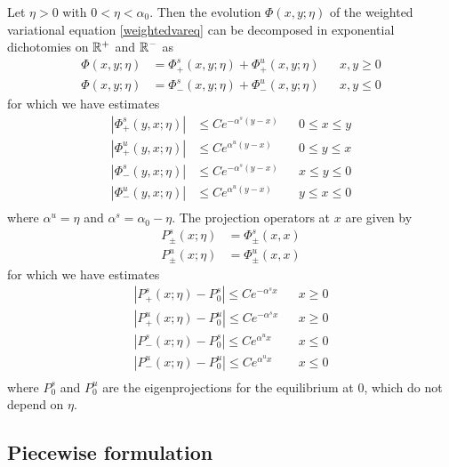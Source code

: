 \documentclass[thesis.tex]{subfiles}
\begin{document}
\begin{lemma}\label{weighteddichotomylemma}
Let $\eta > 0$ with $0 < \eta < \alpha_0$. Then the evolution $\Phi(x, y; \eta)$ of the weighted variational equation \cref{weightedvareq} can be decomposed in exponential dichotomies on $\mathbb{R}^+$ and $\mathbb{R}^-$ as
\begin{align*}
\Phi(x, y; \eta) &= \Phi^s_+(x, y; \eta) + \Phi^u_+(x, y; \eta) && x, y \geq 0 \\
\Phi(x, y; \eta) &= \Phi^s_-(x, y; \eta) + \Phi^u_-(x, y; \eta) && x, y \leq 0 
\end{align*}
for which we have estimates
\begin{align*}
|\Phi^s_+(y,x; \eta)| &\leq Ce^{-\alpha^s(y-x)} && 0 \leq x \leq y \\
|\Phi^u_+(y,x; \eta)| &\leq Ce^{\alpha^u(y-x)}  && 0 \leq y \leq x \\
|\Phi^s_-(y,x; \eta)| &\leq Ce^{-\alpha^s(y-x)} && x \leq y \leq 0 \\
|\Phi^u_-(y,x; \eta)| &\leq Ce^{\alpha^u(y-x)}  && y \leq x \leq 0 \\
\end{align*}
where $\alpha^u = \eta$ and $\alpha^s = \alpha_0 - \eta$. The projection operators at $x$ are given by
\begin{align*}
P^s_\pm(x; \eta) &= \Phi^s_\pm(x,x)\\
P^u_\pm(x; \eta) &= \Phi^u_\pm(x,x)
\end{align*}
for which we have estimates
\begin{equation}\label{weightedprojest}
\begin{aligned}
|P^s_+(x; \eta) - P_0^s| \leq Ce^{-\alpha^s x} && x \geq 0 \\
|P^u_+(x; \eta) - P_0^u| \leq Ce^{-\alpha^s x} && x \geq 0 \\
|P^s_-(x; \eta) - P_0^s| \leq Ce^{\alpha^u x} && x \leq 0 \\
|P^u_-(x; \eta) - P_0^u| \leq Ce^{\alpha^u x} && x \leq 0 \\
\end{aligned}
\end{equation}
where $P_0^s$ and $P_0^u$ are the eigenprojections for the equilibrium at 0, which do not depend on $\eta$.
\end{lemma}

\subsection{Piecewise formulation}\label{sec:kdvRpiecewise}
\end{document}
